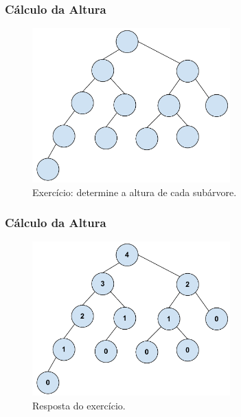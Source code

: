 \begin{frame}
\frametitle{Cálculo da Altura}


\begin{figure}[tbp]
\includegraphics[keepaspectratio=true,width=3in]{figs/fig_arvores/altura1}
\centering
\caption{Exercício: determine a altura de cada subárvore.}
\end{figure}

\end{frame}

\begin{frame}
\frametitle{Cálculo da Altura}

\begin{figure}[tbp]
\includegraphics[keepaspectratio=true,width=3in]{figs/fig_arvores/altura2}
\centering
\caption{Resposta do exercício.}
\end{figure}

\end{frame}


